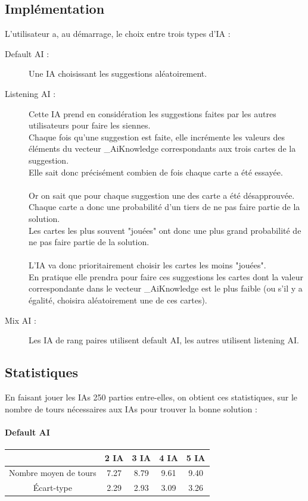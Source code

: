 \documentclass[a4paper,10pt]{article}
\begin{document}
	\subsection{Implémentation}
		L'utilisateur a, au démarrage, le choix entre trois types d'IA :
		\begin{description}
			\item[Default AI :] Une IA choisissant les suggestions aléatoirement.
			
			\item[Listening AI :] Cette IA prend en considération les suggestions faites par les autres utilisateurs pour faire les siennes.\\
					Chaque fois qu'une suggestion est faite, elle incrémente les valeurs des éléments du vecteur \_AiKnowledge correspondants aux trois cartes de la suggestion.\\
					Elle sait donc précisément combien de fois chaque carte a été essayée.\\
					~\\
					Or on sait que pour chaque suggestion une des carte a été désapprouvée. Chaque carte a donc une probabilité d'un tiers de ne pas faire partie de la solution.\\
					Les cartes les plus souvent "jouées" ont donc une plus grand probabilité de ne pas faire partie de la solution.\\
					~\\
					L'IA va donc prioritairement choisir les cartes les moins "jouées".\\
					En pratique elle prendra pour faire ces suggestions les cartes dont la valeur correspondante dans le vecteur \_AiKnowledge est le plus faible (ou s'il y a égalité, choisira aléatoirement une de ces cartes).
			\item[Mix AI :] Les IA de rang paires utilisent default AI, les autres utilisent listening AI.
		\end{description}



	\subsection{Statistiques}
		En faisant jouer les IAs 250 parties entre-elles, on obtient ces statistiques, sur le nombre de tours nécessaires aux IAs pour trouver la bonne solution :
		
		\paragraph*{Default AI}\begin{center}
			\begin{tabular}{|c|c|c|c|c|} \hline
		  									 &	 	 2 IA 		 &  3 IA 	 	 &   4 IA 	 	&   5 IA 	\\ \hline
				Nombre moyen de tours		 & 	 	7.27		& 	8.79		& 	9.61	 	& 	9.40\\ \hline
				Écart-type					&		2.29	 	& 	2.93	 	& 	3.09	 	& 	3.26\\ \hline
			\end{tabular} \end{center}
\end{document}
